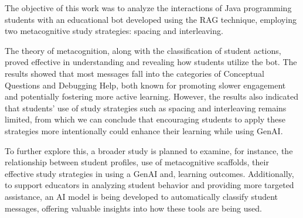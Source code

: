 \documentclass[a4paper,twoside]{article}
\begin{document}
The objective of this work was to analyze the interactions of Java programming
students with an educational bot developed using the RAG technique, employing
two metacognitive study strategies: spacing and interleaving.

The theory of metacognition, along with the classification of student actions,
proved effective in understanding and revealing how students utilize the bot.
The results showed that most messages fall into the categories of Conceptual
Questions and Debugging Help, both known for promoting slower engagement and
potentially fostering more active learning. However, the results also indicated
that students' use of study strategies such as spacing and interleaving remains
limited, from which we can conclude that encouraging students to apply these
strategies more intentionally could enhance their learning while using GenAI.

To further explore this, a broader study is planned to examine, for instance,
the relationship between student profiles, use of metacognitive scaffolds, their
effective study strategies in using a GenAI and, learning outcomes.
Additionally, to support educators in analyzing student behavior and providing
more targeted assistance, an AI model is being developed to automatically
classify student messages, offering valuable insights into how these tools are
being used.


{\small
}
\end{document}
